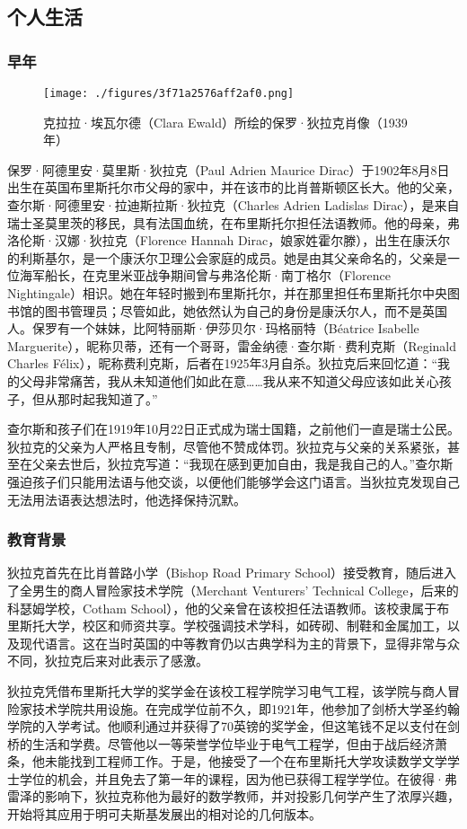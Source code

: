 \subsection{个人生活}  
\subsubsection{早年}
\begin{figure}[ht]
\centering
\texttt{[image: ./figures/3f71a2576aff2af0.png]}
\caption{克拉拉·埃瓦尔德（Clara Ewald）所绘的保罗·狄拉克肖像（1939年）} \label{fig_DLK1_2}
\end{figure}
保罗·阿德里安·莫里斯·狄拉克（Paul Adrien Maurice Dirac）于1902年8月8日出生在英国布里斯托尔市父母的家中，并在该市的比肖普斯顿区长大。他的父亲，查尔斯·阿德里安·拉迪斯拉斯·狄拉克（Charles Adrien Ladislas Dirac），是来自瑞士圣莫里茨的移民，具有法国血统，在布里斯托尔担任法语教师。他的母亲，弗洛伦斯·汉娜·狄拉克（Florence Hannah Dirac，娘家姓霍尔滕），出生在康沃尔的利斯基尔，是一个康沃尔卫理公会家庭的成员。她是由其父亲命名的，父亲是一位海军船长，在克里米亚战争期间曾与弗洛伦斯·南丁格尔（Florence Nightingale）相识。她在年轻时搬到布里斯托尔，并在那里担任布里斯托尔中央图书馆的图书管理员；尽管如此，她依然认为自己的身份是康沃尔人，而不是英国人。保罗有一个妹妹，比阿特丽斯·伊莎贝尔·玛格丽特（Béatrice Isabelle Marguerite），昵称贝蒂，还有一个哥哥，雷金纳德·查尔斯·费利克斯（Reginald Charles Félix），昵称费利克斯，后者在1925年3月自杀。狄拉克后来回忆道：“我的父母非常痛苦，我从未知道他们如此在意……我从来不知道父母应该如此关心孩子，但从那时起我知道了。” 

查尔斯和孩子们在1919年10月22日正式成为瑞士国籍，之前他们一直是瑞士公民。狄拉克的父亲为人严格且专制，尽管他不赞成体罚。狄拉克与父亲的关系紧张，甚至在父亲去世后，狄拉克写道：“我现在感到更加自由，我是我自己的人。”查尔斯强迫孩子们只能用法语与他交谈，以便他们能够学会这门语言。当狄拉克发现自己无法用法语表达想法时，他选择保持沉默。
\subsubsection{教育背景}  
狄拉克首先在比肖普路小学（Bishop Road Primary School）接受教育，随后进入了全男生的商人冒险家技术学院（Merchant Venturers' Technical College，后来的科瑟姆学校，Cotham School），他的父亲曾在该校担任法语教师。该校隶属于布里斯托大学，校区和师资共享。学校强调技术学科，如砖砌、制鞋和金属加工，以及现代语言。这在当时英国的中等教育仍以古典学科为主的背景下，显得非常与众不同，狄拉克后来对此表示了感激。

狄拉克凭借布里斯托大学的奖学金在该校工程学院学习电气工程，该学院与商人冒险家技术学院共用设施。在完成学位前不久，即1921年，他参加了剑桥大学圣约翰学院的入学考试。他顺利通过并获得了70英镑的奖学金，但这笔钱不足以支付在剑桥的生活和学费。尽管他以一等荣誉学位毕业于电气工程学，但由于战后经济萧条，他未能找到工程师工作。于是，他接受了一个在布里斯托大学攻读数学文学学士学位的机会，并且免去了第一年的课程，因为他已获得工程学学位。在彼得·弗雷泽的影响下，狄拉克称他为最好的数学教师，并对投影几何学产生了浓厚兴趣，开始将其应用于明可夫斯基发展出的相对论的几何版本。

